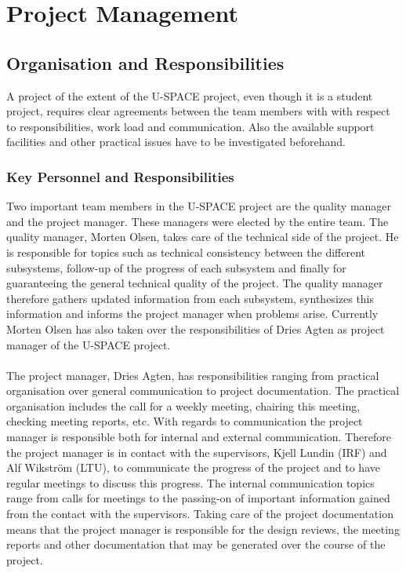 \chapter{Project Management}
\label{chap:project_management}

\section{Organisation and Responsibilities}

A project of the extent of the \ac{U-SPACE} project, even though it is a student project, requires clear agreements between the team members with with respect to responsibilities, work load and communication. Also the available support facilities and other practical issues have to be investigated beforehand.

\subsection{Key Personnel and Responsibilities}

Two important team members in the \ac{U-SPACE} project are the quality manager and the project manager. These managers were elected by the entire team. The quality manager, Morten Olsen, takes care of the technical side of the project. He is responsible for topics such as technical consistency between the different subsystems, follow-up of the progress of each subsystem and finally for guaranteeing the general technical quality of the project. The quality manager therefore gathers updated information from each subsystem, synthesizes this information and informs the project manager when problems arise. Currently Morten Olsen has also taken over the responsibilities of Dries Agten as project manager of the \ac{U-SPACE} project.
\\
\\
The project manager, Dries Agten, has responsibilities ranging from practical organisation over general communication to project documentation. The practical organisation includes the call for a weekly meeting, chairing this meeting, checking meeting reports, etc. With regards to communication the project manager is responsible both for internal and external communication. Therefore the project manager is in contact with the supervisors, Kjell Lundin (\ac{IRF}) and Alf Wikström (\ac{LTU}), to communicate the progress of the project and to have regular meetings to discuss this progress.  The internal communication topics range from calls for meetings to the passing-on of important information gained from the contact with the supervisors. Taking care of the project documentation means that the project manager is responsible for the design reviews, the meeting reports and other documentation that may be generated over the course of the project.

